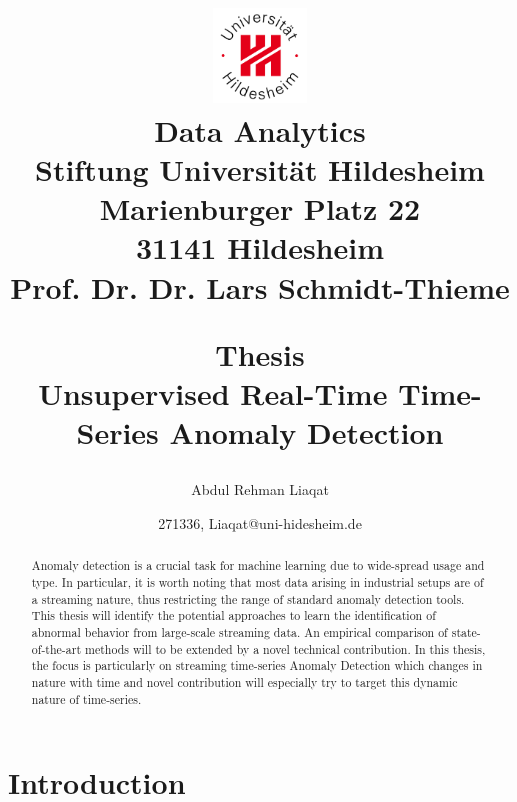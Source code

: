 \documentclass[12pt]{article}
\begin{document}
\title{
\begin{flushright}
\includegraphics[width=2.5cm]{logoUHi.jpg}\\
{\small
Data Analytics\\
Stiftung Universit{\"a}t Hildesheim\\
Marienburger Platz 22\\
31141 Hildesheim\\
Prof. Dr. Dr. Lars Schmidt-Thieme\\
}
\end{flushright}
\bigskip
\begin{center}
Thesis\\
Unsupervised Real-Time Time-Series Anomaly Detection\\
\end{center}
}
\author{Abdul Rehman Liaqat}
\date{271336, Liaqat@uni-hidesheim.de}
\maketitle

\newpage

\begin{abstract}
Anomaly detection is a crucial task for machine learning due to wide-spread usage and type. In particular, it is worth noting that most data arising in industrial setups are of a streaming nature, thus restricting the range of standard anomaly detection tools. This thesis will identify the potential approaches to learn the identification of abnormal behavior from large-scale streaming data. An empirical comparison of state-of-the-art methods will to be extended by a novel technical contribution. In this thesis, the focus is particularly on streaming time-series Anomaly Detection which changes in nature with time and novel contribution will especially try to target this dynamic nature of time-series.
\end{abstract}
\newpage
\tableofcontents
\newpage
\section{Introduction}
\end{document}
